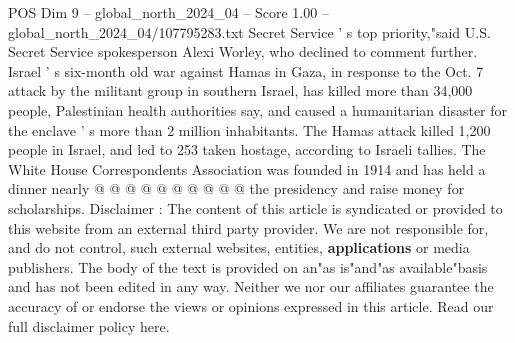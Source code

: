 \begin{textsample}{POS Dim 9 – global\_north\_2024\_04 – Score 1.00 – global\_north\_2024\_04/107795283.txt}
Secret Service ' s top priority,"said U.S.
Secret Service spokesperson Alexi Worley, who declined to comment further.
Israel ' s six-month old war against Hamas in Gaza, in response to the Oct. 7 attack by the militant group in southern Israel, has killed more than 34,000 people, Palestinian health authorities say, and caused a humanitarian disaster for the enclave ' s more than 2 million inhabitants.
The Hamas attack killed 1,200 people in Israel, and led to 253 taken hostage, according to Israeli tallies.
The White House Correspondents Association was founded in 1914 and has held a dinner nearly @ @ @ @ @ @ @ @ @ @ the presidency and raise money for scholarships.
Disclaimer : The content of this article is syndicated or provided to this website from an external third party provider.
We are not responsible for, and do not control, such external websites, entities, \textbf{applications} or media publishers.
The body of the text is provided on an"as is"and"as available"basis and has not been edited in any way.
Neither we nor our affiliates guarantee the accuracy of or endorse the views or opinions expressed in this article.
Read our full disclaimer policy here.

\end{textsample}
